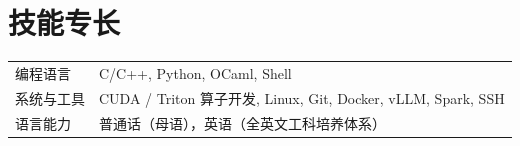 
\section{技能专长}
\begin{tabularx}{\linewidth}{@{}l X@{}}
编程语言 &  \normalsize{C/C++, Python, OCaml, Shell} \\
系统与工具 & \normalsize{CUDA / Triton 算子开发, Linux, Git, Docker, vLLM, Spark, SSH} \\
语言能力 &  \normalsize{普通话（母语），英语（全英文工科培养体系）} \\
\end{tabularx}
